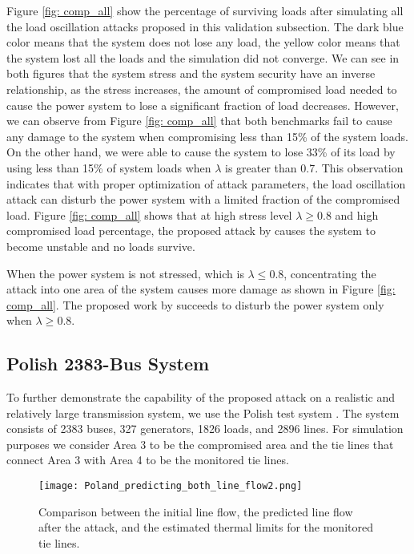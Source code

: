 \documentclass[journal]{IEEEtran}
\begin{document}
Figure %
\ref{fig: comp_all} show the percentage of surviving loads after simulating all the load oscillation attacks proposed in this validation subsection. The dark blue color means that the system does not lose any load, the yellow color means that the system lost all the loads and the simulation did not converge. 
We can see in both figures that the system stress and the system security have an inverse relationship, as the stress increases, the amount of compromised load needed to cause the power system to lose a significant fraction of load decreases. However, we can observe from Figure \ref{fig: comp_all} that both benchmarks fail to cause any damage to the system when compromising less than 15\% of the system loads. On the other hand, we were able to cause the system to lose 33\% of its load by using less than 15\% of system loads when $\lambda$ is greater than 0.7. This observation indicates that with proper optimization of attack parameters, the load oscillation attack can disturb the power system with a limited fraction of the compromised load.
Figure \ref{fig: comp_all} shows that at high stress level $\lambda\geq 0.8$ and high compromised load percentage, the proposed attack by \cite{Anu} causes the system to become unstable and no loads survive.

When the power system is not stressed, which is $\lambda\leq 0.8$, concentrating the attack into one area of the system causes more damage as shown in Figure \ref{fig: comp_all}. The proposed work by \cite{Anu} succeeds to disturb the power system only when $\lambda\geq 0.8$.




\subsection{Polish 2383-Bus System}

To further demonstrate the capability of the proposed attack on a realistic and relatively large transmission system, we use the Polish test system \cite{poland}. The system consists of 2383 buses, 327 generators, 1826 loads, and 2896 lines. For simulation purposes we consider Area 3 to be the compromised area and the tie lines that connect Area 3 with Area 4 to be the monitored tie lines. 

\begin{figure}[t]
\texttt{[image: Poland\_predicting\_both\_line\_flow2.png]}
\caption{Comparison between the initial line flow, the predicted line flow after the attack, and the estimated thermal limits for the monitored tie lines.}
\label{fig: line_s}
\end{figure} 
\end{document}
